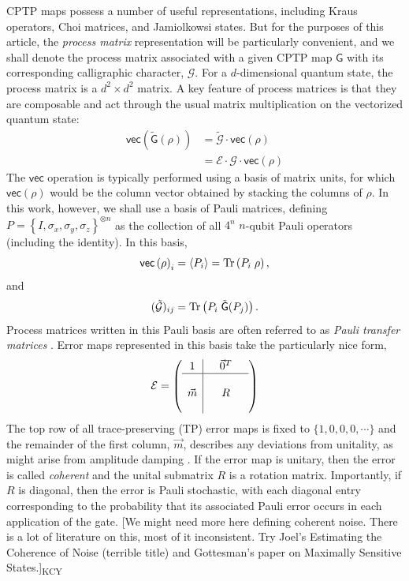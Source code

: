 \documentclass[aps,nofootinbib,pra,notitlepage,twocolumn]{revtex4-1}
\newcommand{\tr}{{\rm Tr\thinspace}}
\newcommand{\expect}[1]{\ensuremath{\left\langle{#1}\right\rangle}}
\newcommand{\kcy}[1]{{\color{red}[#1]\textsubscript{\rm{KCY}}}}
\newcommand{\actual}{\ensuremath{\tilde{\mathsf{G}}}}
\newcommand{\actmat}{\ensuremath{\tilde{\mathcal{G}}}}
\newcommand{\target}{\ensuremath{{\mathsf{G}}}}
\newcommand{\tarmat}{\ensuremath{{\mathcal{G}}}}
\newcommand{\errmat}{\ensuremath{{\mathcal{E}}}}
\newcommand{\vectorize}[1]{\ensuremath{\mathsf{vec}\left(#1\right)}}
\newcommand{\0}{\ensuremath{\mathbf{0}}}
\begin{document}
CPTP maps possess a number of useful representations, including Kraus operators\cite{1983}, Choi matrices\cite{Choi1975}, and Jamiolkowsi states\cite{yczkowski2004}. But for the purposes of this article, the \emph{process matrix} representation will be particularly convenient\cite{OBrien2004}, and we shall denote the process matrix associated with a given CPTP map $\target$ with its corresponding calligraphic character, $\tarmat$. For a $d$-dimensional quantum state, the process matrix is a $d^2\times d^2$ matrix. A key feature of process matrices is that they are composable and act through the usual matrix multiplication on the vectorized quantum state:
\begin{align}
	\vectorize{\actual(\rho)}
		&= \actmat\cdot\vectorize{\rho} \\
		&= \errmat\cdot\tarmat\cdot\vectorize{\rho}
\end{align}
The $\mathsf{vec}$ operation is typically performed using a basis of matrix units, for which $\vectorize{\rho}$ would be the column vector obtained by stacking the columns of $\rho$. In this work, however, we shall use a basis of Pauli matrices, defining $P = \left\{I, \sigma_x, \sigma_y, \sigma_z\right\}^{\otimes n}$ as the collection of all $4^n$ $n$-qubit Pauli operators (including the identity).  In this basis,
\begin{equation}
  \vectorize{\rho}_i = \expect{P_i} = \tr\!\left(P_i\; \rho \right),
\end{equation}
and
\begin{equation}
	(\actmat)_{ij} = \tr\!\left(P_i \;\actual\!\left(P_j\right) \right).
\end{equation}
Process matrices written in this Pauli basis are often referred to as \emph{Pauli transfer matrices} \cite{Chow2012}.  Error maps represented in this basis take the particularly nice form,
\begin{equation}\label{eq:process_matrix}
\errmat =
	\left(\begin{array}{c|cccc}
		1 &  & \vec{0}^T & \\ 
		\hline & &  &  \\
		\vec{m} &  & R &  \\
		 &  &  & 
	\end{array} 	
	\right)
\end{equation}
The top row of all trace-preserving (TP) error maps is fixed to $\{1,0,0,0,\cdots\}$ and the remainder of the first column, $\vec{m}$, describes any deviations from unitality, as might arise from amplitude damping \cite{preskill1997lecture}. If the error map is unitary, then the error is called \textit{coherent} and the unital submatrix $R$ is a rotation matrix.  Importantly, if $R$ is diagonal, then the error is Pauli stochastic, with each diagonal entry corresponding to the probability that its associated Pauli error occurs in each application of the gate. \kcy{We might need more here defining coherent noise. There is a lot of literature on this, most of it inconsistent. Try Joel's Estimating the Coherence of Noise (terrible title) and Gottesman's paper on Maximally Sensitive States.}
\end{document}
